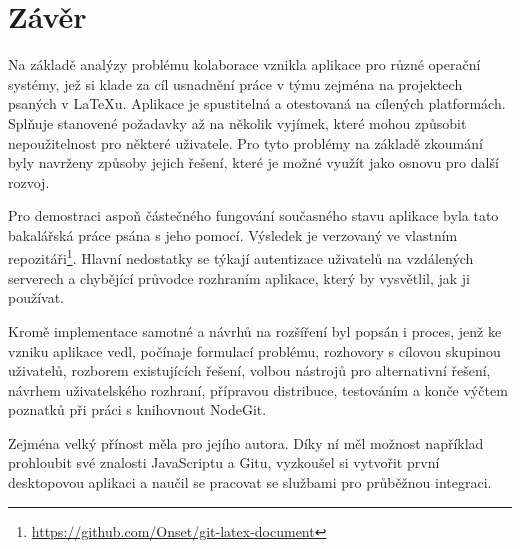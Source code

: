 \chapter{Závěr}

Na základě analýzy problému kolaborace vznikla aplikace pro různé operační systémy, jež si klade za cíl usnadnění práce v týmu zejména na projektech psaných v \LaTeX{u}. Aplikace je spustitelná a otestovaná na cílených platformách. Splňuje stanovené požadavky až na několik vyjímek, které mohou způsobit nepoužitelnost pro některé uživatele. Pro tyto problémy na základě zkoumání byly navrženy způsoby jejich řešení, které je možné využít jako osnovu pro další rozvoj.

Pro demostraci aspoň částečného fungování současného stavu aplikace byla tato bakalářská práce psána s jeho pomocí. Výsledek je verzovaný ve vlastním repozitáři\footnote{\url{https://github.com/Onset/git-latex-document}}. Hlavní nedostatky se týkají autentizace uživatelů na vzdálených serverech a chybějící průvodce rozhraním aplikace, který by vysvětlil, jak ji používat.

Kromě implementace samotné a návrhů na rozšíření byl popsán i proces, jenž ke vzniku aplikace vedl, počínaje formulací problému, rozhovory s cílovou skupinou uživatelů, rozborem existujících řešení, volbou nástrojů pro alternativní řešení, návrhem uživatelského rozhraní, přípravou distribuce, testováním a konče výčtem poznatků při práci s knihovnout NodeGit.

Zejména velký přínost měla pro jejího autora. Díky ní měl možnost například prohloubit své znalosti JavaScriptu a Gitu, vyzkoušel si vytvořit první desktopovou aplikaci a naučil se pracovat se službami pro průběžnou integraci.